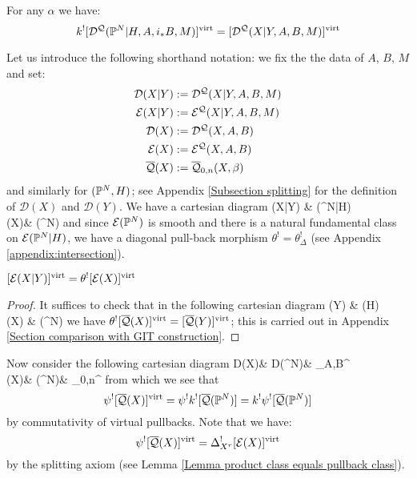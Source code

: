 \begin{lem} \label{Comb loci pull back} For any $\alpha$ we have:
\begin{equation*} k^! [\mathcal D^\mathcal{Q}(\mathbb P^N|H,A,i_*B,M)]^{\operatorname{virt}} = [\mathcal D^\mathcal{Q}(X|Y,A,B,M)]^{\operatorname{virt}} \end{equation*} \end{lem}
Let us introduce the following shorthand notation: we fix the the data of $A$, $B$, $M$ and set:
\begin{align*}
\mathcal{D}(X|Y) & := \mathcal D^{\mathcal{Q}}(X|Y,A,B,M) \\
\mathcal{E}(X|Y) & := \mathcal E^{\mathcal{Q}}(X|Y,A,B,M) \\
\mathcal{D}(X) & := \mathcal{D}^{\mathcal{Q}}(X,A,B) \\
\mathcal{E}(X) & := \mathcal{E}^{\mathcal{Q}}(X,A,B) \\
\overline{\mathcal{Q}}(X) & :=\overline{\mathcal Q}_{0,n}(X,\beta)
\end{align*}
and similarly for $(\mathbb P^N,H)$; see Appendix \ref{Subsection splitting} for the definition of $\mathcal{D}(X)$ and $\mathcal{D}(Y)$. We have a cartesian diagram
\bcd
{}(X|Y) \ar[d]\ar[r] & (\PP^N|H)\ar[d,"\theta"] \\
(X)\ar[r] & (\PP^N)
\ecd
and since $\mathcal{E}(\mathbb P^N)$ is smooth and there is a natural fundamental class on $\mathcal{E}(\mathbb P^N|H)$, we have a diagonal pull-back morphism $\theta^! = \theta_{\Delta}^!$ (see Appendix \ref{appendix:intersection}).
\begin{lemma}\label{theta-pull} $[\mathcal{E}(X|Y)]^{\operatorname{virt}}=\theta^![\mathcal{E}(X)]^{\operatorname{virt}}$ \end{lemma}
\begin{proof}
It suffices to check that in the following cartesian diagram
\bcd
{}(Y) \ar[r] \ar[d]  & (H) \ar[d,"\theta"] \\
(X) \ar[r] & (\PP^N)
\ecd
we have $\theta^! [\overline{\mathcal{Q}}(X)]^{\operatorname{virt}} = [\overline{\mathcal{Q}}(Y)]^{\operatorname{virt}}$; this is carried out in Appendix \ref{Section comparison with GIT construction}.
\end{proof}

Now consider the following cartesian diagram
\bcd
\mathcal D(X)\ar[r]\ar[d,"\varphi_X"] & \mathcal D(\PP^N)\ar[r]\ar[d,"\varphi_{\PP^N}"] & \MM_{A,B}^{}\ar[d,"\psi"] \\
(X)\ar[r,"k"] & (\PP^N)\ar[r] & \MM_{0,n}^{}
\ecd
from which we see that
\[
 \psi^![\overline{\mathcal{Q}}(X)]^{\operatorname{virt}}= \psi^! k^! [ \overline{\mathcal{Q}}(\mathbb P^N)] = k^!\psi^![\overline{\mathcal{Q}}(\mathbb P^N)]
\]
by commutativity of virtual pullbacks. Note that we have:
\begin{equation*} \psi^! [\overline{\mathcal{Q}}(X)]^{\operatorname{virt}} = \Delta_{X^r}^! [\mathcal{E}(X)]^{\operatorname{virt}} \end{equation*}
by the splitting axiom (see Lemma \ref{Lemma product class equals pullback class}).

